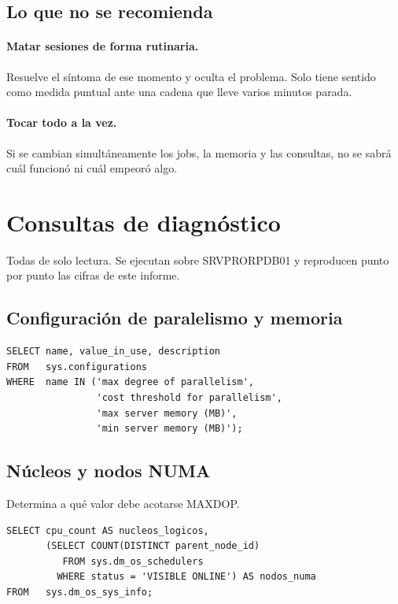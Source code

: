 \documentclass[11pt,a4paper]{article}
\begin{document}
\subsection*{Lo que no se recomienda}

\paragraph{Matar sesiones de forma rutinaria.} Resuelve el síntoma de ese
momento y oculta el problema. Solo tiene sentido como medida puntual ante
una cadena que lleve varios minutos parada.

\paragraph{Tocar todo a la vez.} Si se cambian simultáneamente los jobs, la
memoria y las consultas, no se sabrá cuál funcionó ni cuál empeoró algo.

\newpage
\section{Consultas de diagnóstico}

Todas de solo lectura. Se ejecutan sobre SRVPRORPDB01 y reproducen punto por
punto las cifras de este informe.

\subsection{Configuración de paralelismo y memoria}

\begin{lstlisting}[style=sql]
SELECT name, value_in_use, description
FROM   sys.configurations
WHERE  name IN ('max degree of parallelism',
                'cost threshold for parallelism',
                'max server memory (MB)',
                'min server memory (MB)');
\end{lstlisting}

\subsection{Núcleos y nodos NUMA}

Determina a qué valor debe acotarse MAXDOP.

\begin{lstlisting}[style=sql]
SELECT cpu_count AS nucleos_logicos,
       (SELECT COUNT(DISTINCT parent_node_id)
          FROM sys.dm_os_schedulers
         WHERE status = 'VISIBLE ONLINE') AS nodos_numa
FROM   sys.dm_os_sys_info;
\end{lstlisting}
\end{document}
